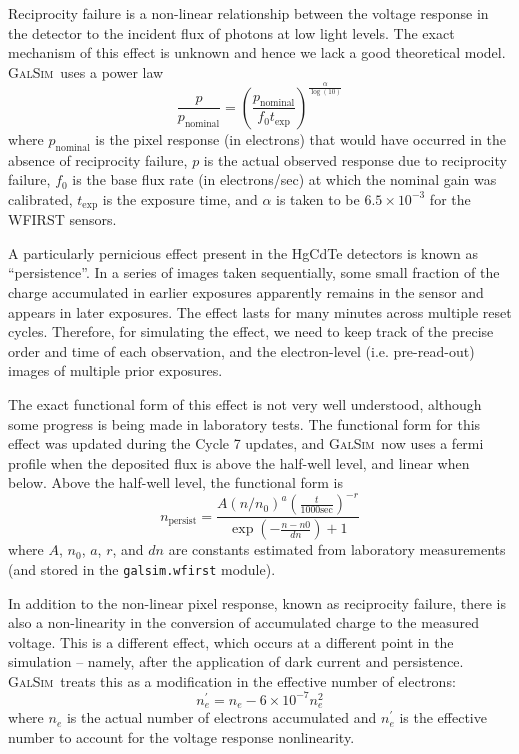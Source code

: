 \documentclass[aps,prd, amsmath,amssymb,superscriptaddress,showkeys,nofootinbib,reprint,preprintnumbers]{revtex4-1}
\newcommand{\galsim}{\textsc{GalSim}}
\begin{document}
Reciprocity failure is a non-linear relationship between the voltage response in the detector to the incident flux of photons at low light levels.
The exact mechanism of this effect is unknown and hence we lack a good theoretical model. 
\galsim\ uses a power law
\begin{equation}
\frac{p}{p_\mathrm{nominal}} =
 \left(\frac{p_\mathrm{nominal}}{f_0 t_\mathrm{exp}}\right)^{\frac{\alpha}{\log(10)}}
\end{equation}
where $p_\mathrm{nominal}$ is the pixel response (in electrons) that would have occurred in the absence of reciprocity failure,
$p$ is the actual observed response due to reciprocity failure,
$f_0$ is the base flux rate (in electrons/sec) at which the nominal gain was calibrated, 
$t_\mathrm{exp}$ is the exposure time,
and $\alpha$ is taken to be $6.5 \times 10^{-3}$ for the WFIRST sensors.

A particularly pernicious effect present in the HgCdTe detectors is known as ``persistence''.  
In a series of images taken sequentially, some small fraction of the charge accumulated in earlier exposures apparently remains in the sensor and appears in later exposures.  
The effect lasts for many minutes across multiple reset cycles.  
Therefore, for simulating the effect, we need to keep track of the precise order and time of each observation, and the electron-level (i.e. pre-read-out) images of multiple prior exposures.

The exact functional form of this effect is not very well understood, although some progress is being made in laboratory tests.  
The functional form for this effect was updated during the Cycle 7 updates, and
\galsim\ now uses a fermi profile when the deposited flux is above the half-well level, and linear when below.
Above the half-well level, the functional form is
\begin{equation}
n_\mathrm{persist} = \frac{A \left(n/n_0\right)^a  \left(\frac{t}{1000 \mathrm{sec}}\right)^{-r}}
{ \exp(- \frac{n-n0}{dn})+ 1}
\end{equation}
where $A$, $n_0$, $a$, $r$, and $dn$ are constants estimated from laboratory measurements (and stored in the \texttt{galsim.wfirst} module).

In addition to the non-linear pixel response, known as reciprocity failure, there is also a non-linearity in the conversion of accumulated charge to the measured voltage.
This is a different effect, which occurs at a different point in the simulation -- namely, after the application of dark current and persistence. 
\galsim\ treats this as a modification in the effective number of electrons:
\begin{equation}
n_e^\prime = n_e - 6 \times 10^{-7} n_e^2
\end{equation}
where $n_e$ is the actual number of electrons accumulated and $n_e^\prime$ is the effective number to account for the voltage response nonlinearity.
\end{document}
